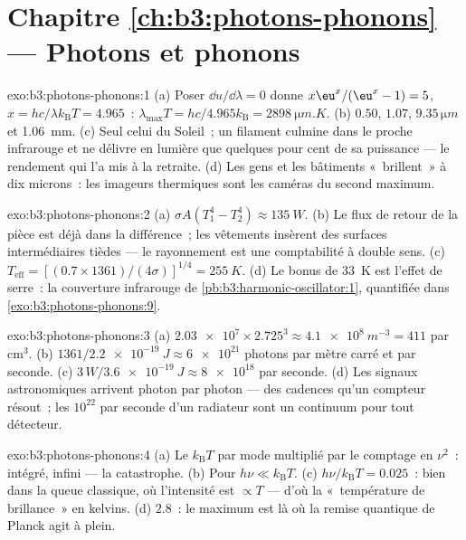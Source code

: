 \section*{Chapitre \ref{ch:b3:photons-phonons} --- Photons et phonons}

\begin{solution}{exo:b3:photons-phonons:1}
(a) Poser $\dd u/\dd\lambda = 0$ donne $x\eu^x/(\eu^x - 1) = 5$,
$x = hc/\lambda k_{\text{B}}T = 4.965$~: $\lambda_{\max}T =
hc/4.965k_{\text{B}} = \qty{2898}{\micro m.K}$. (b) $0.50$,
$1.07$, $9.35\,\unit{\micro m}$ et \qty{1.06}{mm}. (c) Seul celui
du Soleil~; un filament culmine dans le proche infrarouge et ne
délivre en lumière que quelques pour cent de sa puissance --- le
rendement qui l'a mis à la retraite. (d) Les gens et les bâtiments
«~brillent~» à dix microns~: les imageurs thermiques sont les
caméras du second maximum.
\end{solution}

\begin{solution}{exo:b3:photons-phonons:2}
(a) $\sigma A(T_1^4 - T_2^4) \approx \qty{135}{W}$. (b) Le flux
de retour de la pièce est déjà dans la différence~; les vêtements
insèrent des surfaces intermédiaires tièdes --- le rayonnement est
une comptabilité à double sens. (c)
$T_{\text{eff}} = [(0.7 \times 1361)/(4\sigma)]^{1/4} =
\qty{255}{K}$. (d) Le bonus de \qty{33}{K} est l'effet de serre~:
la couverture infrarouge de
\cref{pb:b3:harmonic-oscillator:1}, quantifiée dans
\cref{exo:b3:photons-phonons:9}.
\end{solution}

\begin{solution}{exo:b3:photons-phonons:3}
(a) $\num{2.03e7} \times 2.725^3 \approx \qty{4.1e8}{m^{-3}} =
411$ par cm$^3$. (b) $1361/\qty{2.2e-19}{J} \approx
\num{6e21}$ photons par mètre carré et par seconde. (c) $3\,\unit{W}/
\qty{3.6e-19}{J} \approx \num{8e18}$ par seconde. (d) Les signaux
astronomiques arrivent photon par photon --- des cadences qu'un
compteur résout~; les $10^{22}$ par seconde d'un radiateur sont un
continuum pour tout détecteur.
\end{solution}

\begin{solution}{exo:b3:photons-phonons:4}
(a) Le $k_{\text{B}}T$ par mode multiplié par le comptage en
$\nu^2$~: intégré, infini --- la catastrophe. (b) Pour $h\nu \ll
k_{\text{B}}T$. (c) $h\nu/k_{\text{B}}T = 0.025$~: bien dans la
queue classique, où l'intensité est $\propto T$ --- d'où la
«~température de brillance~» en kelvins. (d) $2.8$~: le maximum est
là où la remise quantique de Planck agit à plein.
\end{solution}


